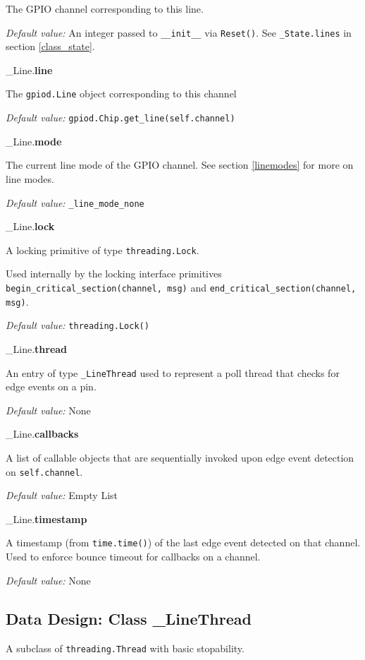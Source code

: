\documentclass[12pt]{article}
\begin{document}
The GPIO channel corresponding to this line.

\textit{Default value:} An integer passed to \texttt{\_\_init\_\_} via \texttt{Reset()}.
See \texttt{\_State.lines} in section \ref{class_state}.

\noindent \_Line.\textbf{line}

The \texttt{gpiod.Line} object corresponding to this channel

\textit{Default value:} \texttt{gpiod.Chip.get\_line(self.channel)}

\noindent \_Line.\textbf{mode}

The current line mode of the GPIO channel. See section \ref{linemodes} for more on line modes.

\textit{Default value:} \texttt{\_line\_mode\_none}

\noindent \_Line.\textbf{lock}

A locking primitive of type \texttt{threading.Lock}.

Used internally by the locking interface primitives
\texttt{begin\_critical\_section(channel, msg)} and
\texttt{end\_critical\_section(channel, msg)}.

\textit{Default value:} \texttt{threading.Lock()}

\noindent \_Line.\textbf{thread}

An entry of type \texttt{\_LineThread} used to represent a poll thread that checks for edge events on a pin.

\textit{Default value:} None

\noindent \_Line.\textbf{callbacks}

A list of callable objects that are sequentially invoked upon edge event detection on \texttt{self.channel}.

\textit{Default value:} Empty List

\noindent \_Line.\textbf{timestamp}

A timestamp (from \texttt{time.time()}) of the last edge event detected on that channel. Used to enforce bounce timeout for callbacks on a channel.

\textit{Default value:} None


\subsection{Data Design: Class \_LineThread}

A subclass of \texttt{threading.Thread} with basic stopability. 

\medskip
\end{document}
